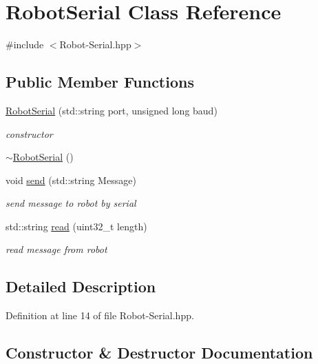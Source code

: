 \hypertarget{class_robot_serial}{}\section{Robot\+Serial Class Reference}
\label{class_robot_serial}


{\ttfamily \#include $<$Robot-\/\+Serial.\+hpp$>$}

\subsection*{Public Member Functions}
\begin{DoxyCompactItemize}
\item 
\hyperlink{class_robot_serial_a3304340db412d4a8e79258c39f908812}{Robot\+Serial} (std\+::string port, unsigned long baud)
\begin{DoxyCompactList}\small\item\em constructor \end{DoxyCompactList}\item 
\hyperlink{class_robot_serial_a1a28818f2b86670f0d8591c5d2e80353}{$\sim$\+Robot\+Serial} ()
\item 
void \hyperlink{class_robot_serial_a48929a3b47818cf3366b003b121ed539}{send} (std\+::string Message)
\begin{DoxyCompactList}\small\item\em send message to robot by serial \end{DoxyCompactList}\item 
std\+::string \hyperlink{class_robot_serial_a2bfa4d4a724c81c8f8b06d47a3c747fb}{read} (uint32\+\_\+t length)
\begin{DoxyCompactList}\small\item\em read message from robot \end{DoxyCompactList}\end{DoxyCompactItemize}


\subsection{Detailed Description}


Definition at line 14 of file Robot-\/\+Serial.\+hpp.



\subsection{Constructor \& Destructor Documentation}
